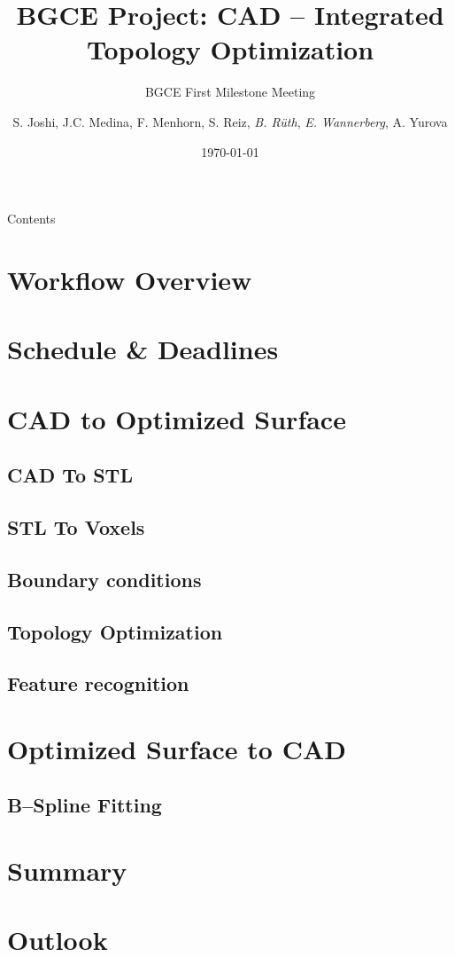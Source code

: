 \documentclass[9pt,pdftex]{beamer}
\title{BGCE Project: CAD -- Integrated Topology Optimization}
\subtitle{BGCE First Milestone Meeting}
\author[E. Wannerberg, B. Rüth] {S. Joshi, J.C. Medina, F. Menhorn, S. Reiz, \textit{B. Rüth}, \textit{E. Wannerberg}, A. Yurova} %
\date{\today}
\institute{Technische Universität München}
\begin{document}
\titlepage
\begin{frame}{Contents}
\tableofcontents
\end{frame}

\section{Workflow Overview}


\section{Schedule \& Deadlines}

\section{CAD to Optimized Surface}


\subsection{CAD To STL}



\subsection{STL To Voxels}



\subsection{Boundary conditions}



\subsection{Topology Optimization}



\subsection{Feature recognition}



\section{Optimized Surface to CAD}

\subsection{B--Spline Fitting}

\section{Summary}

\section{Outlook}

\end{document}
